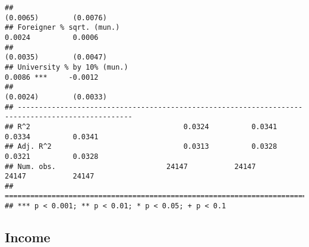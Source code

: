 \documentclass[
]{article}
\begin{document}
\begin{verbatim}
##                                                                       (0.0065)        (0.0076)   
## Foreigner % sqrt. (mun.)                                               0.0024          0.0006    
##                                                                       (0.0035)        (0.0047)   
## University % by 10% (mun.)                                             0.0086 ***     -0.0012    
##                                                                       (0.0024)        (0.0033)   
## -------------------------------------------------------------------------------------------------
## R^2                                    0.0324          0.0341          0.0334          0.0341    
## Adj. R^2                               0.0313          0.0328          0.0321          0.0328    
## Num. obs.                          24147           24147           24147           24147         
## =================================================================================================
## *** p < 0.001; ** p < 0.01; * p < 0.05; + p < 0.1
\end{verbatim}

\hypertarget{income}{%
\subsection{Income}\label{income}}
\end{document}
